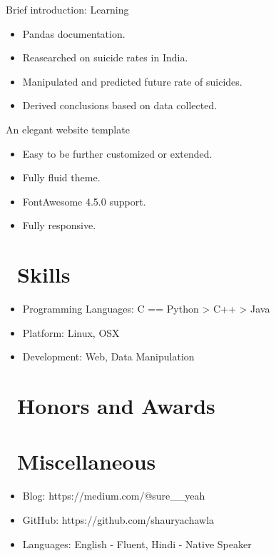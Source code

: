 \documentclass{resume}
\begin{document}
Brief introduction: Learning
\begin{itemize}
  \item Pandas documentation.
  \item Reasearched on suicide rates in India.
  \item Manipulated and predicted future rate of suicides.
  \item Derived conclusions based on data collected.
\end{itemize}

An elegant website template
\begin{itemize}
  \item Easy to be further customized or extended.
  \item Fully fluid theme.
  \item FontAwesome 4.5.0 support.
  \item Fully responsive.

\end{itemize}


\section{\faCogs\ Skills}
\begin{itemize}[parsep=0.5ex]
  \item Programming Languages: C == Python > C++ > Java
  \item Platform: Linux, OSX
  \item Development: Web, Data Manipulation
\end{itemize}

\section{\faHeartO\ Honors and Awards}

\section{\faInfo\ Miscellaneous}
\begin{itemize}[parsep=0.5ex]
  \item Blog: https://medium.com/@sure\_\_yeah
  \item GitHub: https://github.com/shauryachawla
  \item Languages: English - Fluent, Hindi - Native Speaker
\end{itemize}

%
%
\end{document}
